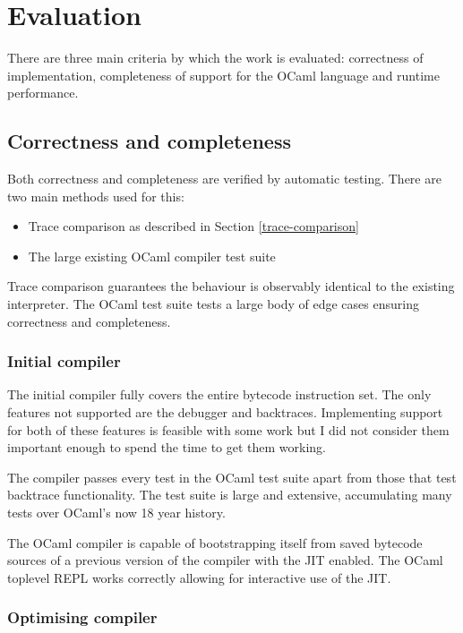 \chapter{Evaluation}

There are three main criteria by which the work is evaluated: correctness of implementation,
completeness of support for the OCaml language and runtime performance.

\section{Correctness and completeness}

Both correctness and completeness are verified by automatic testing. There are two main methods
used
for this:

\begin{itemize}
      \item Trace comparison as described in Section \ref{trace-comparison}
      \item The large existing OCaml compiler test suite
\end{itemize}

Trace comparison guarantees the behaviour is observably identical to the existing interpreter. The
OCaml test suite tests a large body of edge cases ensuring correctness and completeness.

\subsection{Initial compiler}

The initial compiler fully covers the entire bytecode instruction set. The only features not
supported are the debugger and backtraces. Implementing support for both of these features is
feasible with some work but I did not consider them important enough to spend the time to get them
working.

The compiler passes every test in the OCaml test suite apart from those that test backtrace
functionality. The test suite is large and extensive, accumulating many tests over OCaml's now
18 year history.

The OCaml compiler is capable of bootstrapping itself from saved bytecode sources
of a previous version of the compiler with the JIT enabled. The OCaml toplevel REPL works
correctly allowing for interactive use of the JIT.

\subsection{Optimising compiler} \label{eval-opt-comp-qual}

